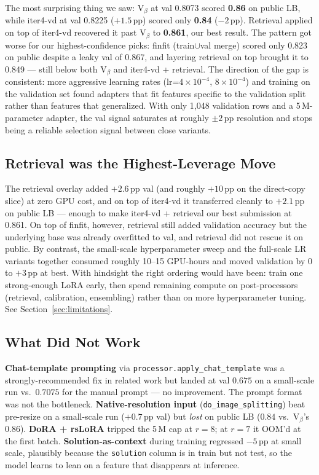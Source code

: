 \documentclass[11pt]{article}
\begin{document}
The most surprising thing we saw: V$_\beta$ at val 0.8073 scored \textbf{0.86} on public LB, while iter4-vd at val 0.8225 ($+1.5$\,pp) scored only \textbf{0.84} ($-2$\,pp). Retrieval applied on top of iter4-vd recovered it past V$_\beta$ to \textbf{0.861}, our best result. The pattern got worse for our highest-confidence picks: finfit (train$\cup$val merge) scored only 0.823 on public despite a leaky val of 0.867, and layering retrieval on top brought it to 0.849 --- still below both V$_\beta$ and iter4-vd + retrieval. The direction of the gap is consistent: more aggressive learning rates (lr=$4\!\times\!10^{-4}$, $8\!\times\!10^{-4}$) and training on the validation set found adapters that fit features specific to the validation split rather than features that generalized. With only 1{,}048 validation rows and a 5\,M-parameter adapter, the val signal saturates at roughly $\pm 2$\,pp resolution and stops being a reliable selection signal between close variants.

\subsection{Retrieval was the Highest-Leverage Move}

The retrieval overlay added $+2.6$\,pp val (and roughly $+10$\,pp on the direct-copy slice) at zero GPU cost, and on top of iter4-vd it transferred cleanly to $+2.1$\,pp on public LB --- enough to make iter4-vd + retrieval our best submission at 0.861. On top of finfit, however, retrieval still added validation accuracy but the underlying base was already overfitted to val, and retrieval did not rescue it on public. By contrast, the small-scale hyperparameter sweep and the full-scale LR variants together consumed roughly 10--15 GPU-hours and moved validation by $0$ to $+3$\,pp at best. With hindsight the right ordering would have been: train one strong-enough LoRA early, then spend remaining compute on post-processors (retrieval, calibration, ensembling) rather than on more hyperparameter tuning. See Section~\ref{sec:limitations}.

\subsection{What Did Not Work}

\textbf{Chat-template prompting} via \texttt{processor.apply\_chat\_template} was a strongly-recommended fix in related work but landed at val $0.675$ on a small-scale run vs.\ $0.7075$ for the manual prompt --- no improvement. The prompt format was not the bottleneck. \textbf{Native-resolution input} (\texttt{do\_image\_splitting}) beat pre-resize on a small-scale run ($+0.7$\,pp val) but \emph{lost} on public LB ($0.84$ vs.\ V$_\beta$'s $0.86$). \textbf{DoRA + rsLoRA} \citep{liu2024dora,kalajdzievski2023rslora} tripped the 5\,M cap at $r=8$; at $r=7$ it OOM'd at the first batch. \textbf{Solution-as-context} during training regressed $-5$\,pp at small scale, plausibly because the \texttt{solution} column is in train but not test, so the model learns to lean on a feature that disappears at inference.
\end{document}

